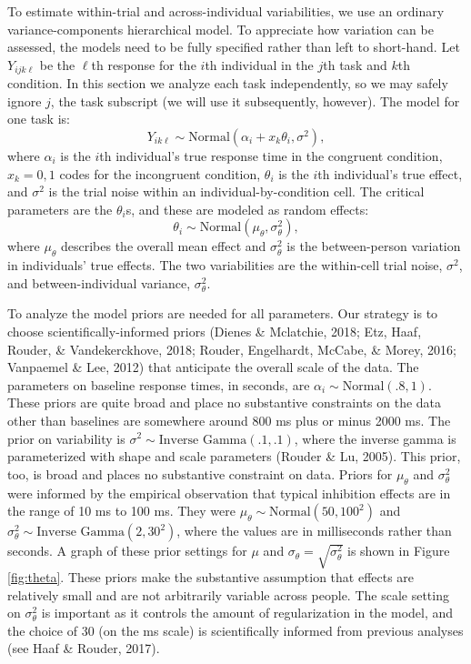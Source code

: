 \documentclass[
  ,man]{apa6}
\begin{document}
To estimate within-trial and across-individual variabilities, we use an ordinary variance-components hierarchical model. To appreciate how variation can be assessed, the models need to be fully specified rather than left to short-hand. Let \(Y_{ijk\ell}\) be the \(\ell\)th response for the \(i\)th individual in the \(j\)th task and \(k\)th condition. In this section we analyze each task independently, so we may safely ignore \(j\), the task subscript (we will use it subsequently, however). The model for one task is:
\[
Y_{ik\ell} \sim \mbox{Normal}(\alpha_i+x_k\theta_i,\sigma^2),
\]
where \(\alpha_i\) is the \(i\)th individual's true response time in the congruent condition, \(x_k=0,1\) codes for the incongruent condition, \(\theta_i\) is the \(i\)th individual's true effect, and \(\sigma^2\) is the trial noise within an individual-by-condition cell. The critical parameters are the \(\theta_i\)s, and these are modeled as random effects:
\[
\theta_i \sim \mbox{Normal}(\mu_\theta,\sigma^2_\theta),
\]
where \(\mu_\theta\) describes the overall mean effect and \(\sigma^2_\theta\) is the between-person variation in individuals' true effects. The two variabilities are the within-cell trial noise, \(\sigma^2\), and between-individual variance, \(\sigma^2_\theta\).

To analyze the model priors are needed for all parameters. Our strategy is to choose scientifically-informed priors (Dienes \& Mclatchie, 2018; Etz, Haaf, Rouder, \& Vandekerckhove, 2018; Rouder, Engelhardt, McCabe, \& Morey, 2016; Vanpaemel \& Lee, 2012) that anticipate the overall scale of the data. The parameters on baseline response times, in seconds, are \(\alpha_i \sim \mbox{Normal}(.8,1)\). These priors are quite broad and place no substantive constraints on the data other than baselines are somewhere around 800 ms plus or minus 2000 ms. The prior on variability is \(\sigma^2 \sim \mbox{Inverse Gamma}(.1,.1)\), where the inverse gamma is parameterized with shape and scale parameters (Rouder \& Lu, 2005). This prior, too, is broad and places no substantive constraint on data. Priors for \(\mu_\theta\) and \(\sigma^2_\theta\) were informed by the empirical observation that typical inhibition effects are in the range of 10 ms to 100 ms. They were \(\mu_\theta \sim \mbox{Normal}(50, 100^2 )\) and \(\sigma^2_\theta \sim \mbox{Inverse Gamma}(2,30^2)\), where the values are in milliseconds rather than seconds. A graph of these prior settings for \(\mu\) and \(\sigma_\theta=\sqrt{\sigma^2_\theta}\) is shown in Figure \ref{fig:theta}. These priors make the substantive assumption that effects are relatively small and are not arbitrarily variable across people. The scale setting on \(\sigma^2_\theta\) is important as it controls the amount of regularization in the model, and the choice of 30 (on the ms scale) is scientifically informed from previous analyses (see Haaf \& Rouder, 2017).
\end{document}
